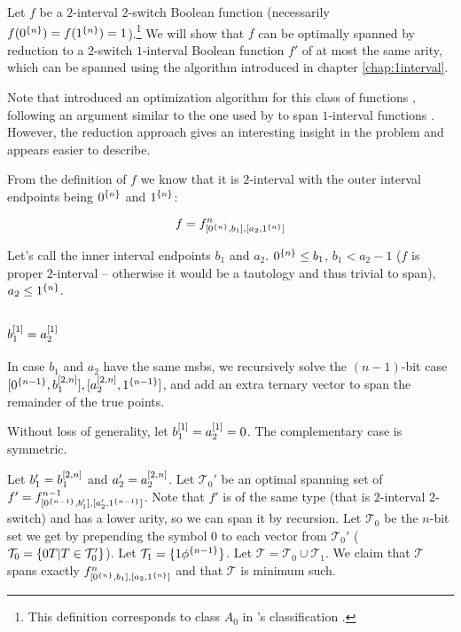 \newcommand{\fnba}{\ftwointtwoswitch{f}{n}{b_1}{a_2}}

Let $f$ be a $2$-interval $2$-switch Boolean function
(necessarily $f(0^{\{n\}}) = f(1^{\{n\}})
= 1$).\footnote{This definition corresponds to class $A_0$
in \citeauthor{Dubovsky2012}'s classification
\citep[p.~5]{Dubovsky2012}.}
We will show that $f$
can be optimally spanned by reduction to
a $2$-switch $1$-interval Boolean function $f'$
of at most the same arity,
which can be spanned using the algorithm introduced
in chapter \ref{chap:1interval}.

Note that
\citeauthor{Dubovsky2012} introduced an optimization algorithm for
this class of functions \citep[section 3.2]{Dubovsky2012},
following an argument similar to the one used by
\citeauthor{Schieber2005154} to span $1$-interval functions
\citep{Schieber2005154}.
However,
the reduction approach gives
an interesting insight in the problem
and appears easier to describe.

From the definition of $f$ we know that it is $2$-interval
with the outer interval endpoints being
$0^{\{n\}}$ and $1^{\{n\}}$:

\[
f = \fnba
\]

Let's call the inner interval endpoints $b_1$ and $a_2$.
$0^{\{n\}} \leq b_1$,
$b_1 < a_2 - 1$ ($f$ is proper $2$-interval
-- otherwise it would be a tautology
and thus trivial to span),
$a_2 \leq 1^{\{n\}}$.

\subsection{\texorpdfstring{$b_1^{[1]} = a_2^{[1]}$}
{ = }
}

In case $b_1$ and $a_2$ have the same \acrshort{msb}s,
we recursively solve the $(n-1)$-bit
case
$[0^{\{n-1\}}, b_1^{[2, n]}],
[a_2^{[2, n]}, 1^{\{n-1\}}]$,
and add an extra ternary vector to span the remainder
of the true points.

Without loss of generality,
let $b_1^{[1]} = a_2^{[1]} = 0$.
The complementary case is symmetric.

Let $b_1' = b_1^{[2, n]}$
and $a_2' = a_2^{[2, n]}$.
Let $\mathcal{T}_0'$ be an optimal spanning set of
$f' = f^{n-1}_{[0^{\{n-1\}}, b_1'], [a_2', 1^{\{n-1\}}]}$.
Note that $f'$ is of the same type
(that is $2$-interval $2$-switch)
and has a lower arity,
so we can span it by recursion.
Let $\mathcal{T}_0$ be the $n$-bit set we get
by prepending the symbol $0$
to each vector from $\mathcal{T}_0'$
($\mathcal{T}_0 = \{0 T | T \in \mathcal{T}_0'\}$).
Let $\mathcal{T}_1 = \{1 \phi^{\{n-1\}}\}$.
Let $\mathcal{T} = \mathcal{T}_0 \cup \mathcal{T}_1$.
We claim that $\mathcal{T}$ spans exactly
$\fnba$
and that $\mathcal{T}$ is minimum such.

